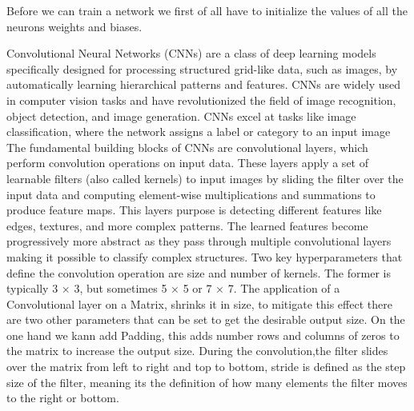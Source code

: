 \documentclass[
a4paper, 
12pt,
grayscalebody, %
abstract=on,
twoside, BCOR10mm, 12pt, DIV13,headinclude, footexclude, final, abstracton, openright
]{ibireprt}
\numberwithin{equation}{chapter}
\numberwithin{table}{chapter}
\numberwithin{figure}{chapter}
\numberwithin{algorithm}{chapter}
\numberwithin{example}{chapter}
\numberwithin{example}{chapter}
\begin{document}
Before we can train a network we first of all have to initialize the values of all the neurons weights and biases.  



Convolutional Neural Networks (CNNs) are a class of deep learning models specifically designed for processing structured grid-like data, such as images, by automatically learning hierarchical patterns and features. CNNs are widely used in computer vision tasks and have revolutionized the field of image recognition, object detection, and image generation. CNNs excel at tasks like image classification, where the network assigns a label or category to an input image\\
The fundamental building blocks of CNNs are convolutional layers, which perform convolution operations on input data. These layers apply a set of learnable filters (also called kernels) to input images by sliding the filter over the input data and computing element-wise multiplications and summations to produce feature maps. This layers purpose is detecting different features like edges, textures, and more complex patterns. The learned features become progressively more abstract as they pass through multiple convolutional layers making it possible to classify complex structures.	Two key hyperparameters that define the convolution operation are size and number of kernels. The former is typically 3 × 3, but sometimes 5 × 5 or 7 × 7. The application of a Convolutional layer on a Matrix, shrinks it in size, to mitigate this effect there are two other parameters that can be set to get the desirable output size. On the one hand we kann add Padding, this adds number rows and columns of zeros to the matrix to increase the output size. During the convolution,the filter slides over the matrix from left to right and top to bottom, stride is defined as the step size of the filter, meaning its the definition of how many elements the filter moves to the right or bottom.\\
\end{document}
